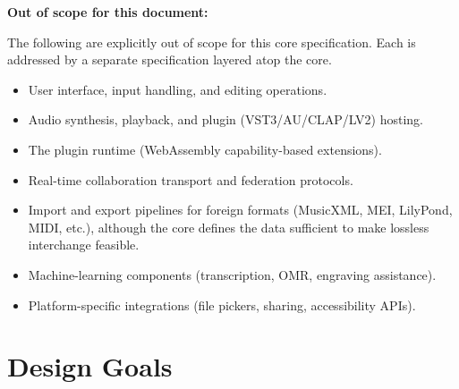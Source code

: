 \documentclass[11pt,letterpaper]{report}
\begin{document}
\textbf{Out of scope for this document:}

\begin{nongoal}
  The following are explicitly out of scope for this core specification.
  Each is addressed by a separate specification layered atop the core.
  \begin{itemize}
    \item User interface, input handling, and editing operations.
    \item Audio synthesis, playback, and plugin (VST3/AU/CLAP/LV2) hosting.
    \item The plugin runtime (WebAssembly capability-based extensions).
    \item Real-time collaboration transport and federation protocols.
    \item Import and export pipelines for foreign formats (MusicXML, MEI,
      LilyPond, MIDI, etc.), although the core defines the data
      sufficient to make lossless interchange feasible.
    \item Machine-learning components (transcription, OMR, engraving
      assistance).
    \item Platform-specific integrations (file pickers, sharing, accessibility
      APIs).
  \end{itemize}
\end{nongoal}

\section{Design Goals}
\end{document}
